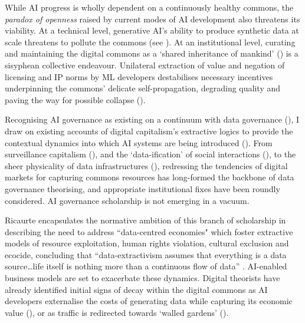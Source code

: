 While AI progress is wholly dependent on a continuously healthy commons, the \textit{paradox of openness} raised by current modes of AI development also threatens its viability. At a technical level, generative AI’s ability to produce synthetic data at scale threatens to pollute the commons (see \textcite{ovadya2019ReducingMaliciousUse}). At an institutional level, curating and maintaining the digital commons as a ‘shared inheritance of mankind’ (\cite{khong2023ARTIFICIALINTELLIGENCECOMMON}) is a sisyphean collective endeavour. Unilateral extraction of value and negation of licensing and IP norms by ML developers destabilises necessary incentives underpinning the commons' delicate self-propagation, degrading quality and paving the way for possible collapse (\cite{meadwayCREATINGDIGITALCOMMONS}). 

Recognising AI governance as existing on a continuum with data governance (\cite{InterwovenRealmsData}), I draw on existing accounts of digital capitalism's extractive logics to provide the contextual dynamics into which AI systems are being introduced (\cite{jameson2019ExtractiveLogicsSystemic}). From surveillance capitalism (\cite{zuboff}), and the ‘data-ification’ of social interactions (\cite{couldry2020CostsConnectionHow, ricaurte2019DataEpistemologiesColoniality}), to the sheer physicality of data infrastructures (\cite{png2022TensionsSouthNorth, 2023PowerEcologyDiplomacy}), redressing the tendencies of digital markets for capturing commons resources has long-formed the backbone of data governance theorising, and appropriate institutional fixes have been roundly considered. AI governance scholarship is not emerging in a vacuum. 

Ricaurte encapsulates the normative ambition of this branch of scholarship in describing the need to address “data-centred economies" which foster extractive models of resource exploitation, human rights violation, cultural exclusion and ecocide, concluding that ``data-extractivism assumes that everything is a data source…life itself is nothing more than a continuous flow of data” \parencite[p. 352]{ricaurte2019DataEpistemologiesColoniality}. AI-enabled business models are set to exacerbate these dynamics. Digital theorists have already identified initial signs of decay within the digital commons as AI developers externalise the costs of generating data while capturing its economic value (\cite{chan2023ReclaimingDigitalCommons}), or as traffic is redirected towards `walled gardens' (\cite{huang2023GenerativeAIDigital}). 

